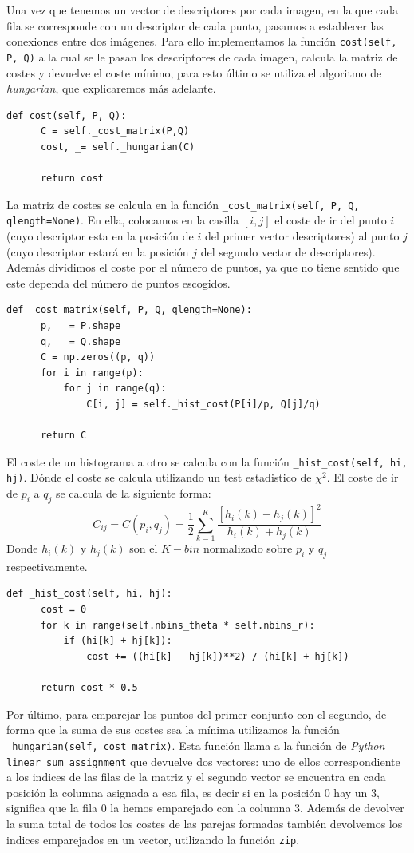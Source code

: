 \documentclass[size=a4, parskip=half, titlepage=false, toc=flat, toc=bib, 12pt]{scrartcl}
\begin{document}
Una vez que tenemos un vector de descriptores por cada imagen, en la que cada fila se corresponde con un descriptor de cada punto, pasamos a establecer las conexiones entre dos imágenes. Para ello implementamos la función \verb|cost(self, P, Q)| a la cual se le pasan los descriptores de cada imagen, calcula la matriz de costes y devuelve el coste mínimo, para esto último se utiliza el algoritmo de \textit{hungarian}, que explicaremos más adelante.
\begin{verbatim}
def cost(self, P, Q):
      C = self._cost_matrix(P,Q)
      cost, _= self._hungarian(C)

      return cost
\end{verbatim}
La matriz de costes se calcula en la función \verb|_cost_matrix(self, P, Q, qlength=None)|. En ella, colocamos en la casilla $[i,j]$ el coste de ir del punto $i$ (cuyo descriptor esta en la posición de $i$ del primer vector descriptores) al punto $j$ (cuyo descriptor estará en la posición $j$ del segundo vector de descriptores). Además dividimos el coste por el número de puntos, ya que no tiene sentido que este dependa del número de puntos escogidos.
\begin{verbatim}
def _cost_matrix(self, P, Q, qlength=None):
      p, _ = P.shape
      q, _ = Q.shape
      C = np.zeros((p, q))
      for i in range(p):
          for j in range(q):
              C[i, j] = self._hist_cost(P[i]/p, Q[j]/q)

      return C
\end{verbatim}
El coste de un histograma a otro se calcula con la función \verb|_hist_cost(self, hi, hj)|. Dónde el coste se calcula utilizando un test estadistico de $\chi^2$. El coste de ir de $p_i$ a $q_j$ se calcula de la siguiente forma:
$$C_{ij} = C(p_i,q_j) = \frac{1}{2} \sum_{k=1}^K \frac{[h_i(k) - h_j(k)]^2}{h_i(k) + h_j(k)} $$
Donde $h_i(k)$ y $h_j(k)$ son el $K-bin$ normalizado sobre $p_i$ y $q_j$ respectivamente.
\begin{verbatim}
def _hist_cost(self, hi, hj):
      cost = 0
      for k in range(self.nbins_theta * self.nbins_r):
          if (hi[k] + hj[k]):
              cost += ((hi[k] - hj[k])**2) / (hi[k] + hj[k])

      return cost * 0.5
\end{verbatim}
Por último, para emparejar los puntos del primer conjunto con el segundo, de forma que la suma de sus costes sea la mínima utilizamos la función \verb| _hungarian(self, cost_matrix)|. Esta función llama a la función de \textit{Python} \verb|linear_sum_assignment| que devuelve dos vectores: uno de ellos correspondiente a los indices de las filas de la matriz y el segundo vector se encuentra en cada posición la columna asignada a esa fila, es decir si en la posición $0$ hay un $3$, significa que la fila 0 la hemos emparejado con la columna 3. Además de devolver la suma total de todos los costes de las parejas formadas también devolvemos los indices emparejados en un vector, utilizando la función \verb|zip|.
\end{document}
